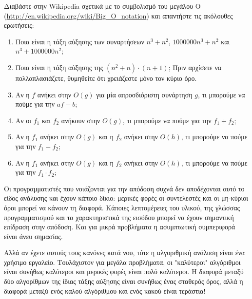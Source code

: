 \documentclass[10pt]{book}
\begin{document}
\begin{exercise}

Διαβάστε στην Wikipedia σχετικά με το συμβολισμό του μεγάλου Ο
(\url{http://en.wikipedia.org/wiki/Big_O_notation}) και απαντήστε τις ακόλουθες ερωτήσεις: 

\begin{enumerate}
\item Ποια είναι η τάξη αύξησης των συναρτήσεων $n^3 + n^2$, $1000000 n^3 + n^2$ και $n^3 + 1000000 n^2$; 

\item Ποια είναι η τάξη αύξησης της $(n^2 + n) \cdot (n + 1)$; Πριν αρχίσετε να πολλαπλασιάζετε,
θυμηθείτε ότι χρειάζεστε μόνο τον κύριο όρο.

\item Αν η $f$ ανήκει στην $O(g)$ για μία απροσδιόριστη συνάρτηση $g$, τι μπορούμε 
να πούμε για την $af+b$; 

\item Αν οι $f_1$ και $f_2$ ανήκουν στην $O(g)$, τι μπορούμε να πούμε για την 
$f_1 + f_2$; 

\item Αν η $f_1$ ανήκει στην $O(g)$ και η $f_2$ ανήκει στην $O(h)$, τι μπορούμε να πούμε για την $f_1 + f_2$; 

\item Αν η $f_1$ ανήκει στην $O(g)$ και η $f_2$ ανήκει στην $O(h)$, τι μπορούμε να 
πούμε για την $f_1 \cdot f_2$; 
\end{enumerate}

\end{exercise}

Οι προγραμματιστές που νοιάζονται για την απόδοση συχνά δεν αποδέχονται αυτό το είδος ανάλυσης
και έχουν κάποιο δίκιο: μερικές φορές οι συντελεστές και οι μη-κύριοι όροι μπορεί να κάνουν τη διαφορά.
Κάποιες λεπτομέρειες του υλικού, της γλώσσας προγραμματισμού και τα χαρακτηριστικά της εισόδου μπορεί
να έχουν σημαντική επίδραση στην απόδοση.  Και για μικρά προβλήματα η ασυμπτωτική συμπεριφορά είναι άνευ
σημασίας.

Αλλά αν έχετε αυτούς τους κανόνες κατά νου, τότε η αλγοριθμική ανάλυση είναι ένα χρήσιμο εργαλείο.
Τουλάχιστον για μεγάλα προβλήματα, οι "καλύτεροι" αλγόριθμοι είναι συνήθως καλύτεροι και μερικές φορές
είναι πολύ καλύτεροι.  Η διαφορά μεταξύ δύο αλγορίθμων της ίδιας τάξης αύξησης είναι συνήθως ένας
σταθερός όρος, αλλά η διαφορά μεταξύ ενός καλού αλγόριθμου και ενός κακού είναι τεράστια! 
\end{document}
